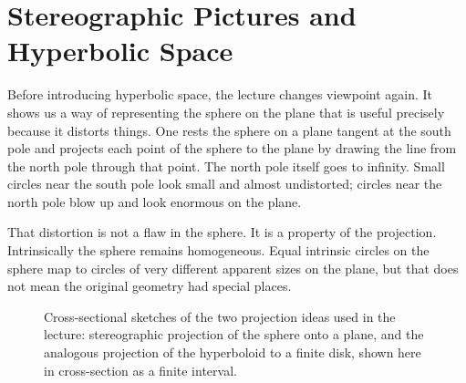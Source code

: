 \section{Stereographic Pictures and Hyperbolic Space}

Before introducing hyperbolic space, the lecture changes viewpoint again. It shows us a way of representing the sphere on the plane that is useful precisely because it distorts things. One rests the sphere on a plane tangent at the south pole and projects each point of the sphere to the plane by drawing the line from the north pole through that point. The north pole itself goes to infinity. Small circles near the south pole look small and almost undistorted; circles near the north pole blow up and look enormous on the plane.

That distortion is not a flaw in the sphere. It is a property of the projection. Intrinsically the sphere remains homogeneous. Equal intrinsic circles on the sphere map to circles of very different apparent sizes on the plane, but that does not mean the original geometry had special places.

\begin{figure}[htbp]
\centering
{}%
\caption{Cross-sectional sketches of the two projection ideas used in the lecture: stereographic projection of the sphere onto a plane, and the analogous projection of the hyperboloid to a finite disk, shown here in cross-section as a finite interval.}
\end{figure}

